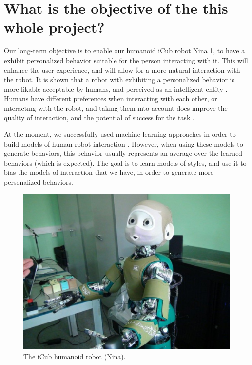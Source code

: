 \section{What is the objective of the this whole project?}
\par Our long-term objective is to enable our humanoid iCub robot Nina \ref{fig:nina_robot}, to have a exhibit personalized behavior suitable for the person interacting with it. This will enhance the user experience, and will allow for a more natural interaction with the robot. It is shown that a robot with exhibiting a personalized behavior is more likable acceptable by humans, and perceived as an intelligent entity \citep{churamani2017impact}. Humans have different preferences when interacting with each other, or interacting with the robot, and taking them into account does improve the quality of interaction, and the potential of success for the task \citep{kashi2018smooth}.

\par At the moment, we successfully used machine learning approaches in order to build models of human-robot interaction \citep{mihoub2016graphical,bailly:hal-01939223,nguyen:hal-01609535}. However, when using these models to generate behaviors, this behavior usually represents an average over the learned behaviors (which is expected). The goal is to learn models of styles, and use it to bias the models of interaction that we have, in order to generate more personalized behaviors.

\begin{figure}[!htbp]
  \begin{center}
    \includegraphics[scale=0.3]{./images/introduction/nina_robot.jpg}
  \end{center}
  \caption{The iCub humanoid robot (Nina).}
  \label{fig:nina_robot}
\end{figure}

